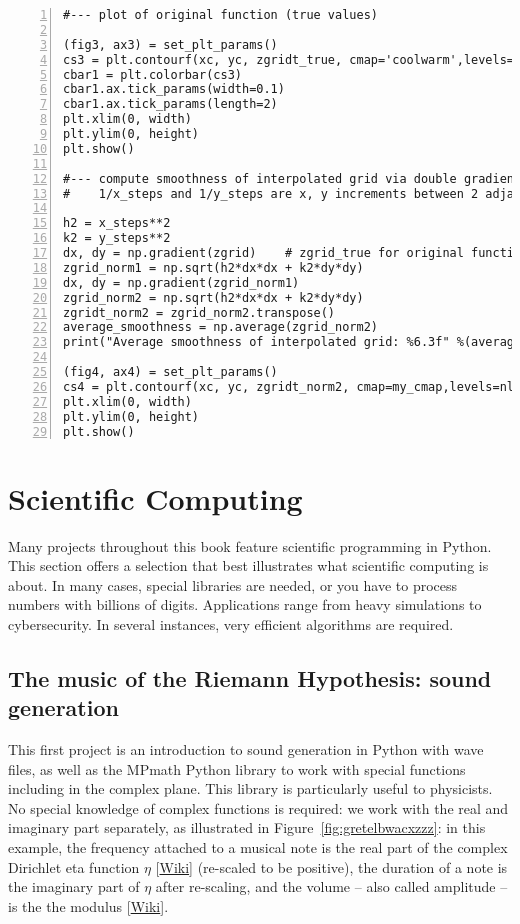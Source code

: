 \documentclass[oneside,10pt]{book}
\begin{document}
\begin{lstlisting}[numbers=left]
#--- plot of original function (true values)

(fig3, ax3) = set_plt_params() 
cs3 = plt.contourf(xc, yc, zgridt_true, cmap='coolwarm',levels=nlevels,linewidths=0.1)
cbar1 = plt.colorbar(cs3)
cbar1.ax.tick_params(width=0.1) 
cbar1.ax.tick_params(length=2) 
plt.xlim(0, width)
plt.ylim(0, height)
plt.show()

#--- compute smoothness of interpolated grid via double gradient 
#    1/x_steps and 1/y_steps are x, y increments between 2 adjacent grid locations

h2 = x_steps**2 
k2 = y_steps**2
dx, dy = np.gradient(zgrid)    # zgrid_true for original function
zgrid_norm1 = np.sqrt(h2*dx*dx + k2*dy*dy)
dx, dy = np.gradient(zgrid_norm1)    
zgrid_norm2 = np.sqrt(h2*dx*dx + k2*dy*dy)  
zgridt_norm2 = zgrid_norm2.transpose()
average_smoothness = np.average(zgrid_norm2) 
print("Average smoothness of interpolated grid: %6.3f" %(average_smoothness)) 

(fig4, ax4) = set_plt_params() 
cs4 = plt.contourf(xc, yc, zgridt_norm2, cmap=my_cmap,levels=nlevels,linewidths=0.1)
plt.xlim(0, width)
plt.ylim(0, height)
plt.show()
\end{lstlisting}



\chapter{Scientific Computing}

Many projects throughout this book feature scientific programming in Python. This section offers a selection that best illustrates what
 scientific computing is about. In many cases, special libraries are needed, or you have to process numbers with billions of digits.  
Applications range from heavy simulations to cybersecurity. In several instances, very efficient algorithms are required. 

\section{The music of the Riemann Hypothesis: sound generation}\label{music911}

This first project is an introduction to sound generation in Python with wave files, as well as the 
\textcolor{index}{MPmath} Python library to work with special functions including in the complex plane.  This library is particularly useful to physicists. No special knowledge of complex functions is required: we work with the real and imaginary part separately, as illustrated in Figure~\ref{fig:gretelbwacxzzz}: in this example,
 the frequency attached to a musical note is the real part of the complex 
\textcolor{index}{Dirichlet eta function} $\eta$ [\href{https://en.wikipedia.org/wiki/Dirichlet_eta_function}{Wiki}] (re-scaled to be positive), the duration of a note is the imaginary part of  $\eta$ after re-scaling, and the volume -- also called amplitude -- is the 
 the modulus [\href{https://en.wikipedia.org/wiki/Complex_modulus}{Wiki}].
\end{document}
